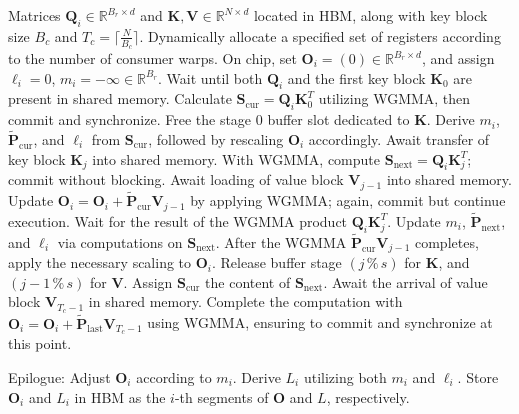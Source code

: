 \begin{algorithm}[H]
    \caption{\small\label{alg:flash3_wgmma}\textsc{FlashAttention-3} consumer warpgroup forward pass}
    \begin{algorithmic}[1]
      \REQUIRE  Matrices $\mathbf{Q}_i \in \mathbb{R}^{B_r \times d}$ and $\mathbf{K}, \mathbf{V} \in \mathbb{R}^{N \times d}$ located in HBM, along with key block size $B_c$ and $T_c = \lceil \frac{N}{B_c} \rceil$.
      \STATE Dynamically allocate a specified set of registers according to the number of consumer warps.
      \STATE On chip, set $\mathbf{O}_i = (0) \in \mathbb{R}^{B_r \times d}$, and assign $\ell_i = 0$, $m_i = -\infty \in \mathbb{R}^{B_r}$.
      \STATE Wait until both $\mathbf{Q}_i$ and the first key block $\mathbf{K}_0$ are present in shared memory.
      \STATE Calculate $\mathbf{S}_{\mathrm{cur}} = \mathbf{Q}_i \mathbf{K}_0^T$ utilizing WGMMA, then commit and synchronize.
      \STATE Free the stage 0 buffer slot dedicated to $\mathbf{K}$.
      \STATE Derive $m_{i}$, $\tilde{\mathbf{P}}_{\mathrm{cur}}$, and $\ell_{i}$ from $\mathbf{S}_{\mathrm{cur}}$, followed by rescaling $\mathbf{O}_i$ accordingly.
        \STATE Await transfer of key block $\mathbf{K}_j$ into shared memory.
        \label{code:mainloop_start}
        \STATE With WGMMA, compute $\mathbf{S}_{\mathrm{next}} = \mathbf{Q}_i \mathbf{K}_{j}^T$; commit without blocking. \label{code:first_wgmma}
        \STATE Await loading of value block $\mathbf{V}_{j-1}$ into shared memory.
        \STATE Update $\mathbf{O}_{i} = \mathbf{O}_{i} + \tilde{\mathbf{P}}_{\mathrm{cur}} \mathbf{V}_{j-1}$ by applying WGMMA; again, commit but continue execution. \label{code:second_wgmma}
        \STATE Wait for the result of the WGMMA product $\mathbf{Q}_i \mathbf{K}_{j}^T$.
        \STATE Update $m_{i}$, $\tilde{\mathbf{P}}_{\mathrm{next}}$, and $\ell_{i}$ via computations on $\mathbf{S}_{\mathrm{next}}$. \label{code:softmax}
        \STATE After the WGMMA $\tilde{\mathbf{P}}_{\mathrm{cur}} \mathbf{V}_{j-1}$ completes, apply the necessary scaling to $\mathbf{O}_i$.
        \STATE Release buffer stage $(j\,\%\,s)$ for $\mathbf{K}$, and $(j-1\,\%\,s)$ for $\mathbf{V}$.
        \STATE Assign $\mathbf{S}_{\mathrm{cur}}$ the content of $\mathbf{S}_{\mathrm{next}}$.
        \label{code:mainloop_end}
      \ENDFOR \STATE Await the arrival of value block $\mathbf{V}_{T_c - 1}$ in shared memory.
      \STATE Complete the computation with
      $\mathbf{O}_{i} = \mathbf{O}_{i} + \tilde{\mathbf{P}}_{\mathrm{last}} \mathbf{V}_{T_c - 1}$ using WGMMA, ensuring to commit and synchronize at this point.

\STATE Epilogue: Adjust $\mathbf{O}_{i}$ according to $m_{i}$. Derive $L_{i}$ utilizing both $m_{i}$ and $\ell_{i}$.
Store $\mathbf{O}_{i}$ and $L_{i}$ in HBM as the $i$-th segments of $\mathbf{O}$ and $L$, respectively.
\end{algorithmic}
\end{algorithm}

